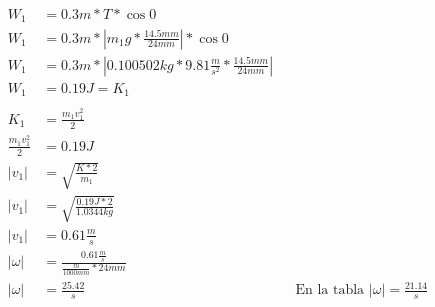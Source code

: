\begin{enumerate}
\begin{itemize}
				\begin{align*}
					W_1 &= 0.3m*T *\cos{0}\\
					W_1 &= 0.3m*|m_1g* \frac{14.5mm}{24mm} | *\cos{0}\\
					W_1 &= 0.3m*|0.100502kg*9.81 \frac{m}{s^2} *\frac{14.5mm}{24mm} | \\
					W_1 &= 0.19J = K_1\\
					\\
					K_1 &= \frac{m_1v_1^2}{2} \\
					\frac{m_1v_1^2}{2} &= 0.19J\\
					|v_1| &= \sqrt{ \frac{K*2}{m_1} }\\
					|v_1| &= \sqrt{ \frac{0.19J*2}{1.0344kg} }\\
					|v_1| &= 0.61 \frac{m}{s} \\
					|\omega| &= \frac{0.61 \frac{m}{s}}{ \frac{m}{1000mm}* 24mm} \\
					|\omega| &= \frac{25.42}{s}&&\text{En la tabla $|\omega|= \frac{21.14}{s}$}
				\end{align*}
		\end{itemize}
\end{enumerate}
